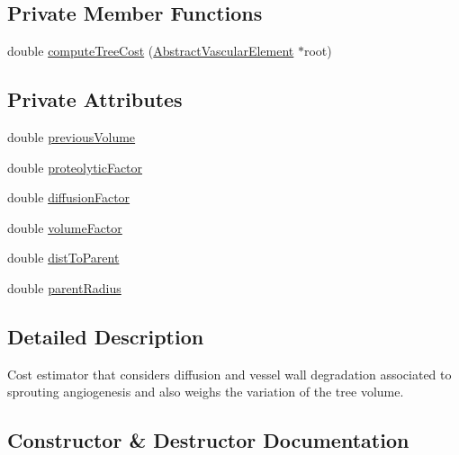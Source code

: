 \subsection*{Private Member Functions}
\begin{DoxyCompactItemize}
\item 
double \hyperlink{class_sprouting_volumetric_cost_estimator_a0a8f5cb6b80ec26f6025c430372f58cf}{compute\+Tree\+Cost} (\hyperlink{class_abstract_vascular_element}{Abstract\+Vascular\+Element} $\ast$root)
\end{DoxyCompactItemize}
\subsection*{Private Attributes}
\begin{DoxyCompactItemize}
\item 
double \hyperlink{class_sprouting_volumetric_cost_estimator_af63fec9f1deab61aadd3f5f2889956a2}{previous\+Volume}
\item 
double \hyperlink{class_sprouting_volumetric_cost_estimator_a9bedc9f85b7b98700fd977bfbe956a33}{proteolytic\+Factor}
\item 
double \hyperlink{class_sprouting_volumetric_cost_estimator_afe49d902defafd1c47bd5c0ac39580cf}{diffusion\+Factor}
\item 
double \hyperlink{class_sprouting_volumetric_cost_estimator_ae0a2bc9b3f1b08ff1b69367a638452fe}{volume\+Factor}
\item 
double \hyperlink{class_sprouting_volumetric_cost_estimator_af607b0ebd1aad6a5106c24cbd4452bd5}{dist\+To\+Parent}
\item 
double \hyperlink{class_sprouting_volumetric_cost_estimator_a4244e87579d0ff6b989ef221fff16187}{parent\+Radius}
\end{DoxyCompactItemize}


\subsection{Detailed Description}
Cost estimator that considers diffusion and vessel wall degradation associated to sprouting angiogenesis and also weighs the variation of the tree volume. 

\subsection{Constructor \& Destructor Documentation}
